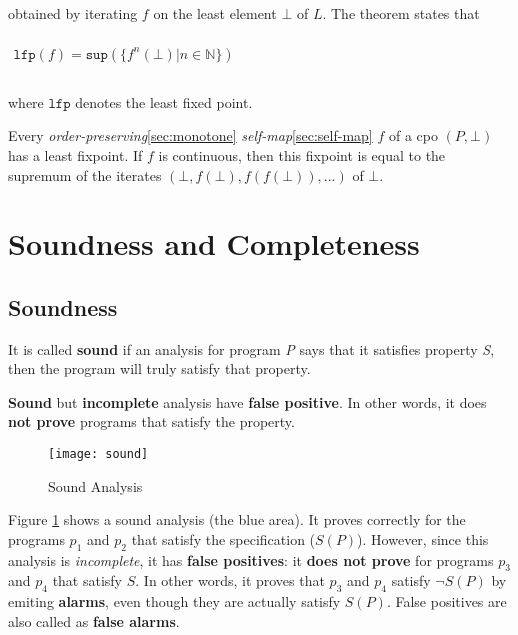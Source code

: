 obtained by iterating $f$ on the least element $\bot$ of $L$. The
theorem states that

\begin{math}
  \begin{array}{c}
    \\
    \mathtt{lfp}(f) = \mathtt{sup}( \{ f^n(\bot) | n \in \mathbb{N}\})\\
    \\
  \end{array}
\end{math}

where $\mathtt{lfp}$ denotes the least fixed point.


Every \textit{order-preserving}\ref{sec:monotone}
\textit{self-map}\ref{sec:self-map} $f$ of a cpo $(P, \bot)$ has a
least fixpoint. If $f$ is continuous, then this fixpoint is equal to
the supremum of the iterates $(\bot, f(\bot), f(f(\bot)), ...)$ of
$\bot$.




\section{Soundness and Completeness}

\subsection{Soundness}


It is called \textbf{sound} if an analysis for program \textsl{P} says
that it satisfies property \textsl{S}, then the program will truly
satisfy that property.

\textbf{Sound} but \textbf{incomplete} analysis have \textbf{false
  positive}. In other words, it does \textbf{not prove} programs that
satisfy the property.

\begin{figure}[h]
  \texttt{[image: sound]}
  \caption{Sound Analysis}
  \label{fig:sound}
\end{figure}

Figure \ref{fig:sound} shows a sound analysis (the blue area). It
proves correctly for the programs $ p_1 $ and $ p_2 $ that satisfy the
specification ($S(P)$). However, since this analysis is
\textit{incomplete}, it has \textbf{false positives}: it \textbf{does
  not prove} for programs $ p_3 $ and $ p_4 $ that satisfy $S$. In
other words, it proves that $ p_3 $ and $ p_4 $ satisfy $ \neg S(P) $
by emiting \textbf{alarms}, even though they are actually satisfy
$ S(P) $. False positives are also called as \textbf{false alarms}.


